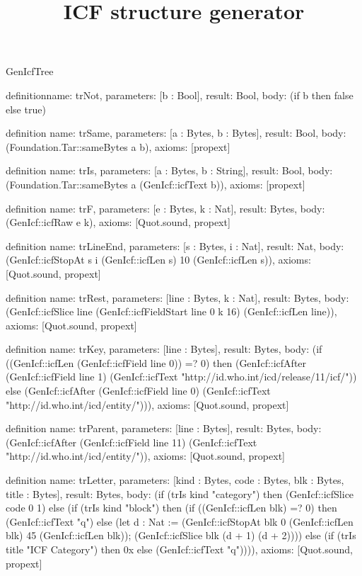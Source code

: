 \begin{lexlean}{GenIcfTree}
\title{ICF structure generator}
\begin{semanticmodule}
definition{name: trNot, parameters: [b : Bool], result: Bool, body: (if b then false else true)}

definition{
  name: trSame,
  parameters: [a : Bytes, b : Bytes],
  result: Bool,
  body: (Foundation.Tar::sameBytes a b),
  axioms: [propext]
}

definition{
  name: trIs,
  parameters: [a : Bytes, b : String],
  result: Bool,
  body: (Foundation.Tar::sameBytes a (GenIcf::icfText b)),
  axioms: [propext]
}

definition{
  name: trF,
  parameters: [e : Bytes, k : Nat],
  result: Bytes,
  body: (GenIcf::icfRaw e k),
  axioms: [Quot.sound, propext]
}

definition{
  name: trLineEnd,
  parameters: [s : Bytes, i : Nat],
  result: Nat,
  body: (GenIcf::icfStopAt s i (GenIcf::icfLen s) 10 (GenIcf::icfLen s)),
  axioms: [Quot.sound, propext]
}

definition{
  name: trRest,
  parameters: [line : Bytes, k : Nat],
  result: Bytes,
  body: (GenIcf::icfSlice line (GenIcf::icfFieldStart line 0 k 16) (GenIcf::icfLen line)),
  axioms: [Quot.sound, propext]
}

definition{
  name: trKey,
  parameters: [line : Bytes],
  result: Bytes,
  body: (if ((GenIcf::icfLen (GenIcf::icfField line 0)) =? 0) then (GenIcf::icfAfter (GenIcf::icfField line 1) (GenIcf::icfText "http://id.who.int/icd/release/11/icf/")) else (GenIcf::icfAfter (GenIcf::icfField line 0) (GenIcf::icfText "http://id.who.int/icd/entity/"))),
  axioms: [Quot.sound, propext]
}

definition{
  name: trParent,
  parameters: [line : Bytes],
  result: Bytes,
  body: (GenIcf::icfAfter (GenIcf::icfField line 11) (GenIcf::icfText "http://id.who.int/icd/entity/")),
  axioms: [Quot.sound, propext]
}

definition{
  name: trLetter,
  parameters: [kind : Bytes, code : Bytes, blk : Bytes, title : Bytes],
  result: Bytes,
  body: (if (trIs kind "category") then (GenIcf::icfSlice code 0 1) else (if (trIs kind "block") then (if ((GenIcf::icfLen blk) =? 0) then (GenIcf::icfText "q") else (let d : Nat := (GenIcf::icfStopAt blk 0 (GenIcf::icfLen blk) 45 (GenIcf::icfLen blk)); (GenIcf::icfSlice blk (d + 1) (d + 2)))) else (if (trIs title "ICF Category") then 0x else (GenIcf::icfText "q")))),
  axioms: [Quot.sound, propext]
}


\end{semanticmodule}
\end{lexlean}
